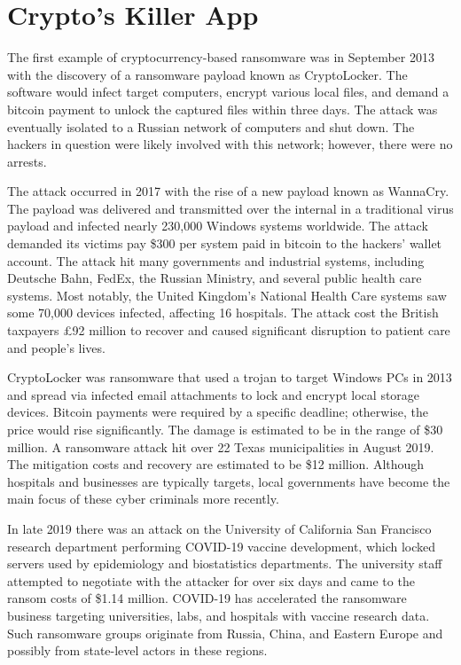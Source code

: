 \section{Crypto's Killer App}

The first example of cryptocurrency-based ransomware was in September 2013 with
the discovery of a ransomware payload known as CryptoLocker. The software would
infect target computers, encrypt various local files, and demand a bitcoin
payment to unlock the captured files within three days. The attack was
eventually isolated to a Russian network of computers and shut down. The hackers
in question were likely involved with this network; however, there were no
arrests.

The attack occurred in 2017 with the rise of a new payload known as WannaCry.
The payload was delivered and transmitted over the internal in a traditional
virus payload and infected nearly 230,000 Windows systems worldwide. The attack
demanded its victims pay \$300 per system paid in bitcoin to the hackers' wallet
account. The attack hit many governments and industrial systems, including
Deutsche Bahn, FedEx, the Russian Ministry, and several public health care
systems. Most notably, the United Kingdom's National Health Care systems saw
some 70,000 devices infected, affecting 16 hospitals. The attack cost the
British taxpayers £92 million to recover and caused significant disruption to
patient care and people's lives. \cite{popper_ransomware_2020}

CryptoLocker was ransomware that used a trojan to target Windows PCs in 2013 and
spread via infected email attachments to lock and encrypt local storage devices.
Bitcoin payments were required by a specific deadline; otherwise, the price
would rise significantly. The damage is estimated to be in the range of \$30
million. A ransomware attack hit over 22 Texas municipalities in August 2019.
The mitigation costs and recovery are estimated to be \$12 million. Although
hospitals and businesses are typically targets, local governments have become
the main focus of these cyber criminals more recently.

In late 2019 there was an attack on the University of California San Francisco
research department performing COVID-19 vaccine development, which locked
servers used by epidemiology and biostatistics departments. The university staff
attempted to negotiate with the attacker for over six days and came to the
ransom costs of \$1.14 million. COVID-19 has accelerated the ransomware business
targeting universities, labs, and hospitals with vaccine research data. Such
ransomware groups originate from Russia, China, and Eastern Europe and possibly
from state-level actors in these regions. \cite{xia_dont_2020, mehrotra_ucsf_2020}

